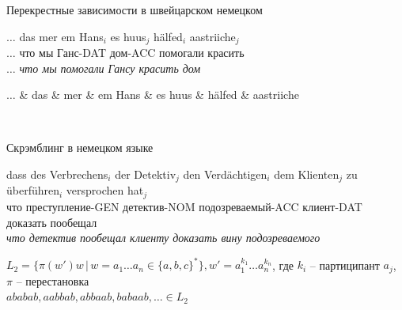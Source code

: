 \documentclass{beamer}
\begin{document}
\begin{frame}{Перекрестные зависимости в швейцарском немецком}
\begin{scriptsize}
\begin{exe}
	\ex 
		\gll $\ldots$ das mer {em Hans}$_i$ {es huus}$_j$ h\"{a}lfed$_i$ aastriiche$_j$ \\
             $\ldots$ что мы Ганс-DAT дом-ACC помогали красить\\
		\glt $\ldots$ \textit{что мы помогали Гансу красить дом}
\end{exe}	
\end{scriptsize}

\begin{dependency}[theme = simple]
   \begin{deptext}[column sep=1em]
        $\ldots$ \& das \& mer \& em Hans \& es huus \& h\"{a}lfed \& aastriiche \\
   \end{deptext}
\end{dependency}\\
\end{frame}

\begin{frame}{Скрэмблинг в немецком языке}
\begin{scriptsize}
\begin{exe}
	\ex 
		\gll dass {des Verbrechens}$_i$ {der Detektiv}$_j$ {den Verd\"{a}chtigen}$_i$ {dem Klienten}$_j$ {zu \"{u}berf\"{u}hren}$_i$ {versprochen hat}$_j$\\
             что преступление-GEN детектив-NOM подозреваемый-ACC клиент-DAT доказать пообещал\\
		\glt \textit{что детектив пообещал клиенту доказать вину подозреваемого}
\end{exe}	
\end{scriptsize}
\medskip
$L_2 = \{\pi(w')w \, | \, w = a_1 \dots a_n \in \{a, b, c\}^*\}, w' = a_1^{k_1} \ldots a_n^{k_n}$, где $k_i$ -- партиципант $a_j$, $\pi$ -- перестановка\\
\smallskip
$ababab, aabbab, abbaab, babaab, \ldots \in L_2$
\end{frame}
\end{document}
